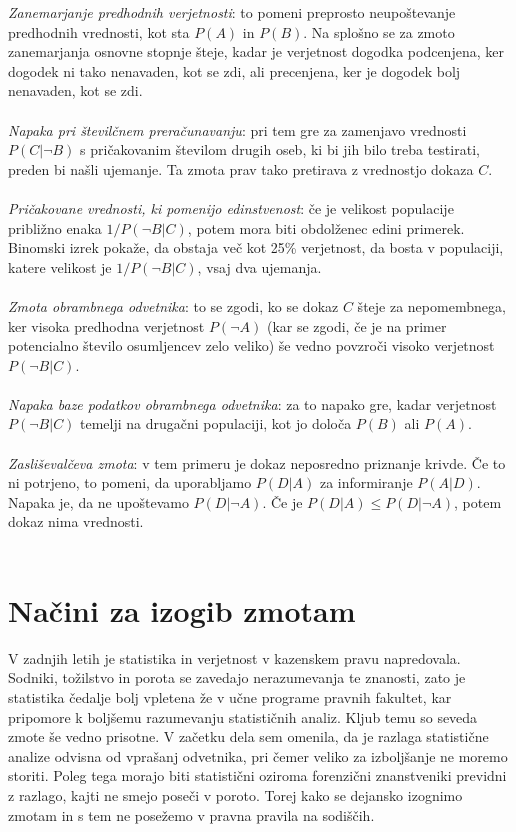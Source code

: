 \documentclass[12pt,a4paper]{amsart}
\theoremstyle{definition} %
\theoremstyle{plain} %
\begin{document}
\textit{Zanemarjanje predhodnih verjetnosti}: to pomeni preprosto neupoštevanje predhodnih vrednosti, kot sta $P(A)$ in $P(B)$. Na splošno
se za zmoto zanemarjanja osnovne stopnje šteje, kadar je verjetnost dogodka podcenjena, ker dogodek ni tako nenavaden, kot se zdi,
ali precenjena, ker je dogodek bolj nenavaden, kot se zdi.\\\\
\textit{Napaka pri številčnem preračunavanju}: pri tem gre za zamenjavo vrednosti $P(C \lvert \neg B)$ s pričakovanim številom drugih oseb,
ki bi jih bilo treba testirati, preden bi našli ujemanje. Ta zmota prav tako pretirava z vrednostjo dokaza $C$.\\\\
\textit{Pričakovane vrednosti, ki pomenijo edinstvenost}: če je velikost populacije približno enaka $1/P(\neg B \lvert C)$, potem mora biti
obdolženec edini primerek. Binomski izrek pokaže, da obstaja več kot 25\% verjetnost, da bosta v populaciji, katere velikost je $1/P(\neg B \lvert C)$,
vsaj dva ujemanja.\\\\
\textit{Zmota obrambnega odvetnika}: to se zgodi, ko se dokaz $C$ šteje za nepomembnega, ker visoka predhodna verjetnost $P(\neg A)$ (kar
se zgodi, če je na primer potencialno število osumljencev zelo veliko) še vedno povzroči visoko verjetnost $P(\neg B \lvert C)$. \\\\
\textit{Napaka baze podatkov obrambnega odvetnika}: za to napako gre, kadar verjetnost $P(\neg B \lvert C)$ temelji na drugačni populaciji,
kot jo določa $P(B)$ ali $P(A)$.\\\\
\textit{Zasliševalčeva zmota}: v tem primeru je dokaz neposredno priznanje krivde. Če to ni potrjeno, to pomeni, da uporabljamo $P(D \lvert A)$ za
informiranje $P(A \lvert D)$. Napaka je, da ne upoštevamo $P(D \lvert \neg A)$. Če je $P(D \lvert A) \leq P(D \lvert \neg A)$, potem dokaz
nima vrednosti.\\\\

\section{Načini za izogib zmotam}
V zadnjih letih je statistika in verjetnost v kazenskem pravu napredovala. Sodniki, tožilstvo in porota se zavedajo nerazumevanja te znanosti, zato 
je statistika čedalje bolj vpletena že v učne programe pravnih fakultet, kar pripomore k boljšemu razumevanju statističnih analiz. Kljub temu so seveda 
zmote še vedno prisotne. V začetku dela sem omenila, da je razlaga statistične analize odvisna od vprašanj odvetnika, pri čemer veliko za izboljšanje 
ne moremo storiti. Poleg tega morajo biti statistični oziroma forenzični znanstveniki previdni z razlago, kajti ne smejo poseči v poroto. Torej kako 
se dejansko izognimo zmotam in s tem ne posežemo v pravna pravila na sodiščih. 
\end{document}
